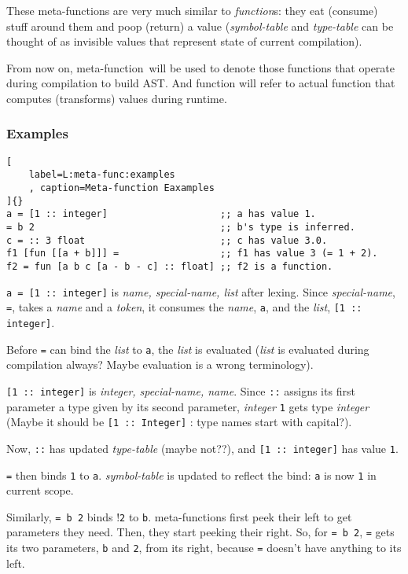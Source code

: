 \documentclass[12pt,letterpaper,notitlepage]{article}
\newcommand{\op}{meta-function}
\begin{document}
These \op s are very much similar to \emph{function}s:
they eat (consume) stuff around them and poop (return) a value
(\emph{symbol-table} and \emph{type-table} can be thought of as
invisible values that represent state of current compilation).

From now on, \op\ will be used to denote those functions that
operate during compilation to build AST. And function will refer to
actual function that computes (transforms) values during runtime.

\subsubsection{Examples}
\label{S:ops:examples}

\begin{lstlisting}[
    label=L:meta-func:examples
    , caption=Meta-function Eaxamples
]{}
a = [1 :: integer]                    ;; a has value 1.
= b 2                                 ;; b's type is inferred.
c = :: 3 float                        ;; c has value 3.0.
f1 [fun [[a + b]]] =                  ;; f1 has value 3 (= 1 + 2).
f2 = fun [a b c [a - b - c] :: float] ;; f2 is a function.
\end{lstlisting}
\verb!a = [1 :: integer]! is \emph{name, special-name, list} after
lexing. Since \emph{special-name}, \verb!=!, takes a \emph{name}
and a \emph{token}, it consumes the \emph{name}, \verb!a!, and
the \emph{list}, \verb![1 :: integer]!.

Before \verb!=! can bind the \emph{list} to \verb!a!,
the \emph{list} is evaluated (\emph{list} is evaluated during
compilation always? Maybe evaluation is a wrong terminology).

\verb![1 :: integer]! is \emph{integer, special-name, name}.
Since \verb!::! assigns its first parameter a type given by its second
parameter, \emph{integer} \verb!1! gets type \emph{integer}
(Maybe it should be \verb![1 :: Integer]! : type names start with capital?).

Now, \verb!::! has updated
\emph{type-table} (maybe not??), and \verb![1 :: integer]! has value \verb!1!.

\verb!=! then binds \verb!1! to \verb!a!. \emph{symbol-table}
is updated to reflect the bind: \verb!a! is now \verb!1! in current scope.

Similarly, \verb!= b 2! binds !\verb!2! to \verb!b!.
\op s first peek their left to get parameters they need.
Then, they start peeking their right.
So, for \verb!= b 2!, \verb!=! gets its two parameters, \verb!b! and \verb!2!,
from its right, because \verb!=! doesn't have anything to its left.
\end{document}
